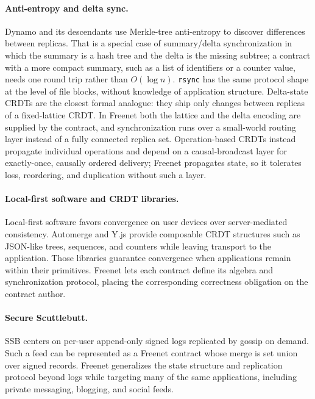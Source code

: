 \paragraph{Anti-entropy and delta sync.} Dynamo \citep{decandia2007dynamo} and its descendants use Merkle-tree anti-entropy to discover differences between replicas. That is a special case of summary/delta synchronization in which the summary is a hash tree and the delta is the missing subtree; a contract with a more compact summary, such as a list of identifiers or a counter value, needs one round trip rather than $O(\log n)$. \texttt{rsync} \citep{tridgell1999rsync} has the same protocol shape at the level of file blocks, without knowledge of application structure. Delta-state CRDTs \citep{almeida2018delta} are the closest formal analogue: they ship only changes between replicas of a fixed-lattice CRDT. In Freenet both the lattice and the delta encoding are supplied by the contract, and synchronization runs over a small-world routing layer instead of a fully connected replica set. Operation-based CRDTs instead propagate individual operations and depend on a causal-broadcast layer for exactly-once, causally ordered delivery; Freenet propagates state, so it tolerates loss, reordering, and duplication without such a layer.

\paragraph{Local-first software and CRDT libraries.} Local-first software \citep{kleppmann2019local} favors convergence on user devices over server-mediated consistency. Automerge \citep{automerge} and Y.js \citep{yjs} provide composable CRDT structures such as JSON-like trees, sequences, and counters while leaving transport to the application. Those libraries guarantee convergence when applications remain within their primitives. Freenet lets each contract define its algebra and synchronization protocol, placing the corresponding correctness obligation on the contract author.

\paragraph{Secure Scuttlebutt.} SSB \citep{scuttlebutt} centers on per-user append-only signed logs replicated by gossip on demand. Such a feed can be represented as a Freenet contract whose merge is set union over signed records. Freenet generalizes the state structure and replication protocol beyond logs while targeting many of the same applications, including private messaging, blogging, and social feeds.

